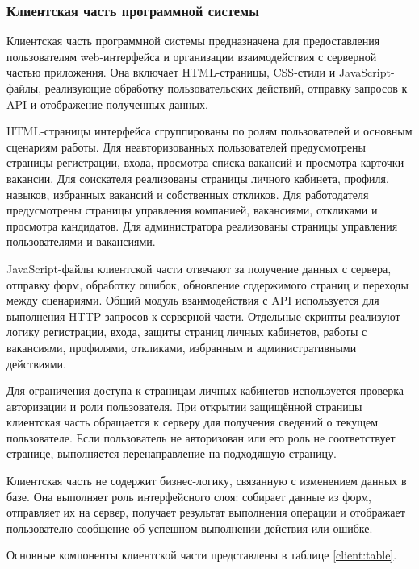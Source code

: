 \subsubsection{Клиентская часть программной системы}

Клиентская часть программной системы предназначена для предоставления пользователям web-интерфейса и организации взаимодействия с серверной частью приложения. Она включает HTML-страницы, CSS-стили и JavaScript-файлы, реализующие обработку пользовательских действий, отправку запросов к API и отображение полученных данных.

HTML-страницы интерфейса сгруппированы по ролям пользователей и основным сценариям работы. Для неавторизованных пользователей предусмотрены страницы регистрации, входа, просмотра списка вакансий и просмотра карточки вакансии. Для соискателя реализованы страницы личного кабинета, профиля, навыков, избранных вакансий и собственных откликов. Для работодателя предусмотрены страницы управления компанией, вакансиями, откликами и просмотра кандидатов. Для администратора реализованы страницы управления пользователями и вакансиями.

JavaScript-файлы клиентской части отвечают за получение данных с сервера, отправку форм, обработку ошибок, обновление содержимого страниц и переходы между сценариями. Общий модуль взаимодействия с API используется для выполнения HTTP-запросов к серверной части. Отдельные скрипты реализуют логику регистрации, входа, защиты страниц личных кабинетов, работы с вакансиями, профилями, откликами, избранным и административными действиями.

Для ограничения доступа к страницам личных кабинетов используется проверка авторизации и роли пользователя. При открытии защищённой страницы клиентская часть обращается к серверу для получения сведений о текущем пользователе. Если пользователь не авторизован или его роль не соответствует странице, выполняется перенаправление на подходящую страницу.

Клиентская часть не содержит бизнес-логику, связанную с изменением данных в базе. Она выполняет роль интерфейсного слоя: собирает данные из форм, отправляет их на сервер, получает результат выполнения операции и отображает пользователю сообщение об успешном выполнении действия или ошибке.

Основные компоненты клиентской части представлены в таблице \ref{client:table}.

